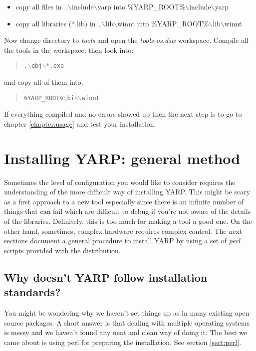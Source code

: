 \begin{itemize}
\item copy all files in ..$\backslash$include$\backslash$yarp into \%YARP\_ROOT\%$\backslash$include$\backslash$yarp
\item copy all libraries (*.lib) in ..$\backslash$lib$\backslash$winnt into
\%YARP\_ROOT\%$\backslash$lib$\backslash$winnt
\end{itemize}

Now change directory to {\em tools} and open the {\em tools-os.dsw} workspace. Compile all the tools in the workspace; then look into:

\begin{quote}
{\tt .$\backslash$obj$\backslash$*.exe}
\end{quote}

\noindent and copy all of them into:

\begin{quote}
{\tt \%YARP\_ROOT\%$\backslash$bin$\backslash$winnt}
\end{quote}

If everything compiled and no errors showed up then the next step is to go to chapter \ref{chapter:usage} and test your installation. 


\section{Installing YARP: general method}
Sometimes the level of configuration you would like to consider requires the understanding of the more difficult way of installing YARP. This might be scary as a first approach to a new tool especially since there is an infinite number of things that can fail which are difficult to debug if you're not aware of the details of the libraries. Definitely, this is too much for making a tool a good one. On the other hand, sometimes, complex hardware requires complex control. The next sections document a general procedure to install YARP by using a set of {\em perl} scripts provided with the distribution.

\subsection{Why doesn't YARP follow installation standards?}
You might be wondering why we haven't set things up as in many existing open source packages. A short answer is that dealing with multiple operating systems is messy and we haven't found any neat and clean way of doing it. The best we came about is using perl for preparing the installation. See section \ref{sect:perl}.

